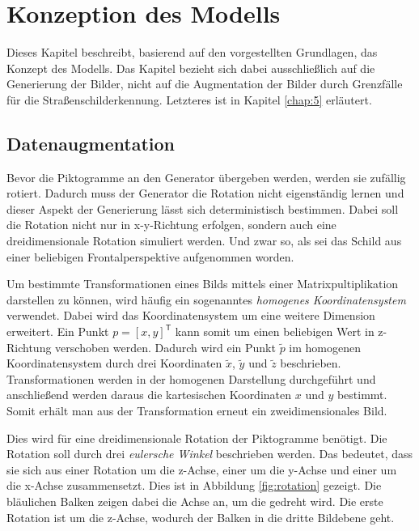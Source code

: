 \chapter{Konzeption des Modells}
\label{chap:konzept}

Dieses Kapitel beschreibt, basierend auf den vorgestellten Grundlagen, das Konzept des Modells. Das Kapitel bezieht sich dabei ausschließlich auf die Generierung der Bilder, nicht auf die Augmentation der Bilder durch Grenzfälle für die Straßenschilderkennung. Letzteres ist in Kapitel \ref{chap:5} erläutert.







\section{Datenaugmentation}
\label{chap:3-datenaugmentation}
Bevor die Piktogramme an den Generator übergeben werden, werden sie zufällig rotiert. Dadurch muss der Generator die Rotation nicht eigenständig lernen und dieser Aspekt der Generierung lässt sich deterministisch bestimmen. Dabei soll die Rotation nicht nur in x-y-Richtung erfolgen, sondern auch eine dreidimensionale Rotation simuliert werden. Und zwar so, als sei das Schild aus einer beliebigen Frontalperspektive aufgenommen worden.

Um bestimmte Transformationen eines Bilds mittels einer Matrixpultiplikation darstellen zu können, wird häufig ein sogenanntes \emph{homogenes Koordinatensystem} verwendet. Dabei wird das Koordinatensystem um eine weitere Dimension erweitert. Ein Punkt $p = [x, y]^\mathsf{T}$ kann somit um einen beliebigen Wert in z-Richtung verschoben werden. Dadurch wird ein Punkt $\tilde{p}$ im homogenen Koordinatensystem durch drei Koordinaten $\tilde{x}$, $\tilde{y}$ und $\tilde{z}$ beschrieben. Transformationen werden in der homogenen Darstellung durchgeführt und anschließend werden daraus die kartesischen Koordinaten $x$ und $y$ bestimmt. Somit erhält man aus der Transformation erneut ein zweidimensionales Bild. \cite{geometric-ops} \cite{math-primer}

Dies wird für eine dreidimensionale Rotation der Piktogramme benötigt. Die Rotation soll durch drei \emph{eulersche Winkel} beschrieben werden. Das bedeutet, dass sie sich aus einer Rotation um die z-Achse, einer um die y-Achse und einer um die x-Achse zusammensetzt. Dies ist in Abbildung \ref{fig:rotation} gezeigt. Die bläulichen Balken zeigen dabei die Achse an, um die gedreht wird. Die erste Rotation ist um die z-Achse, wodurch der Balken in die dritte Bildebene geht. \cite{math-primer}

